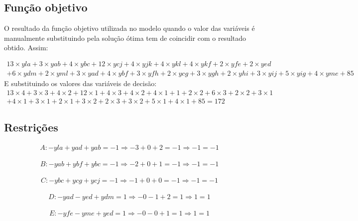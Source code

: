 \documentclass[a4paper]{report}
\begin{document}
\subsection{Função objetivo}
O resultado da função objetivo utilizada no modelo quando o valor das variáveis
é manualmente substituindo pela solução ótima tem de coincidir com o resultado
obtido. Assim:

\begin{multline}
13\times yla + 3\times yab + 4\times ybc + 12\times ycj + 4\times
yjk + 4\times ykl + 4\times ykf + 2\times yfe + 2\times yed \\ + 6\times ydm +
2\times yml + 3\times yad + 4\times ybf + 3\times yfh + 2\times ycg +
3\times ygh + 2\times yhi + 3\times yij + 5\times yig + 4\times yme + 85
\end{multline}
E substituindo os valores das variáveis de decisão:
\begin{multline}
13\times 4 + 3\times 3 + 4\times 2 + 12\times 1 + 4\times
3 + 4\times 2 + 4\times 1 + 1 + 2\times 2 + 6\times 3 +
2\times 2 + 3\times 1 \\ + 4\times 1 + 3\times 1 + 2\times 1 +
3\times 2 + 2\times 3 + 3\times 2 + 5\times 1 + 4\times 1 + 85
= 172
\end{multline}

\subsection{Restrições}
\begin{multline}
A: - yla + yad + yab = -1
\Rightarrow - 3 + 0 + 2 = -1 
\Rightarrow -1 = -1
\end{multline}

\begin{multline}
B: - yab + ybf + ybc = -1
\Rightarrow - 2 + 0 + 1 = -1
\Rightarrow -1 = -1
\end{multline}

\begin{multline}
C: - ybc + ycg + ycj = -1
\Rightarrow - 1 + 0 + 0 = -1
\Rightarrow -1 = -1
\end{multline}

\begin{multline}
D: - yad - yed + ydm = 1
\Rightarrow - 0 - 1 + 2 = 1
\Rightarrow 1 = 1
\end{multline}

\begin{multline}
E: - yfe - yme + yed = 1
\Rightarrow - 0 - 0 + 1 = 1
\Rightarrow 1 = 1
\end{multline}
\end{document}
